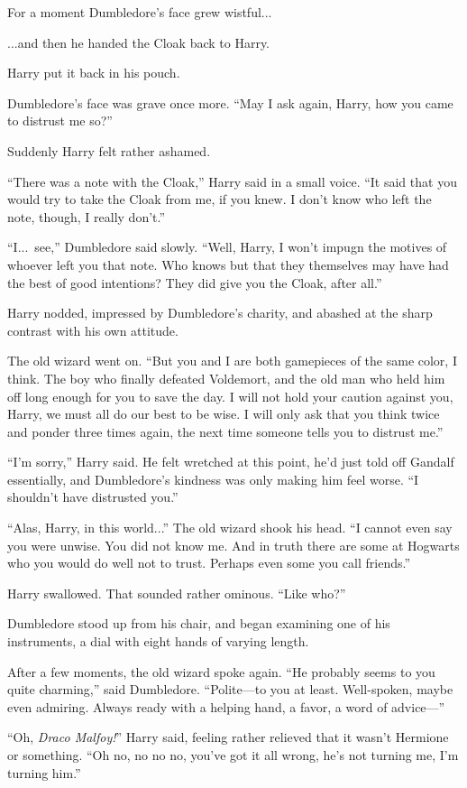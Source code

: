For a moment Dumbledore’s face grew wistful...

...and then he handed the Cloak back to Harry.

Harry put it back in his pouch.

Dumbledore’s face was grave once more. “May I ask again, Harry, how you came to distrust me so?”

Suddenly Harry felt rather ashamed.

“There was a note with the Cloak,” Harry said in a small voice. “It said that you would try to take the Cloak from me, if you knew. I don’t know who left the note, though, I really don’t.”

“I...\ see,” Dumbledore said slowly. “Well, Harry, I won’t impugn the motives of whoever left you that note. Who knows but that they themselves may have had the best of good intentions? They did give you the Cloak, after all.”

Harry nodded, impressed by Dumbledore’s charity, and abashed at the sharp contrast with his own attitude.

The old wizard went on. “But you and I are both gamepieces of the same color, I think. The boy who finally defeated Voldemort, and the old man who held him off long enough for you to save the day. I will not hold your caution against you, Harry, we must all do our best to be wise. I will only ask that you think twice and ponder three times again, the next time someone tells you to distrust me.”

“I’m sorry,” Harry said. He felt wretched at this point, he’d just told off Gandalf essentially, and Dumbledore’s kindness was only making him feel worse. “I shouldn’t have distrusted you.”

“Alas, Harry, in this world...” The old wizard shook his head. “I cannot even say you were unwise. You did not know me. And in truth there are some at Hogwarts who you would do well not to trust. Perhaps even some you call friends.”

Harry swallowed. That sounded rather ominous. “Like who?”

Dumbledore stood up from his chair, and began examining one of his instruments, a dial with eight hands of varying length.

After a few moments, the old wizard spoke again. “He probably seems to you quite charming,” said Dumbledore. “Polite—to you at least. Well-spoken, maybe even admiring. Always ready with a helping hand, a favor, a word of advice—”

“Oh, \emph{Draco Malfoy!}” Harry said, feeling rather relieved that it wasn’t Hermione or something. “Oh no, no no no, you’ve got it all wrong, he’s not turning me, I’m turning him.”

